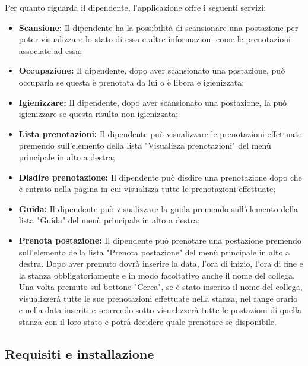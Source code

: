 Per quanto riguarda il dipendente, l'applicazione offre i seguenti servizi:
\begin{itemize}
	\item \textbf{Scansione:} Il dipendente ha la possibilità di scansionare una postazione per poter visualizzare lo stato di essa e altre informazioni come le prenotazioni associate ad essa; \\
	\item \textbf{Occupazione:} Il dipendente, dopo aver scansionato una postazione, può occuparla se questa è prenotata da lui o è libera e igienizzata; \\
	\item \textbf{Igienizzare:} Il dipendente, dopo aver scansionato una postazione, la può igienizzare se questa risulta non igienizzata; \\
	\item \textbf{Lista prenotazioni:} Il dipendente può visualizzare le prenotazioni effettuate premendo sull'elemento della lista "Visualizza prenotazioni" del menù principale in alto a destra; \\
	\item \textbf{Disdire prenotazione:} Il dipendente può disdire una prenotazione dopo che è entrato nella pagina in cui visualizza tutte le prenotazioni effettuate; \\
	\item \textbf{Guida:} Il dipendente può visualizzare la guida premendo sull'elemento della lista "Guida" del menù principale in alto a destra; \\
	\item \textbf{Prenota postazione:} Il dipendente può prenotare una postazione premendo sull'elemento della lista "Prenota postazione" del menù principale in alto a destra.
	Dopo aver premuto dovrà inserire la data, l'ora di inizio, l'ora di fine e la stanza obbligatoriamente e in modo facoltativo anche il nome del collega.
	Una volta premuto sul bottone "Cerca", se è stato inserito il nome del collega, visualizzerà tutte le sue prenotazioni effettuate nella stanza, nel range orario e nella data inseriti e scorrendo sotto visualizzerà tutte le postazioni di quella stanza con il loro stato e potrà decidere quale prenotare se disponibile. \\	
\end{itemize}




\subsection{Requisiti e installazione}


